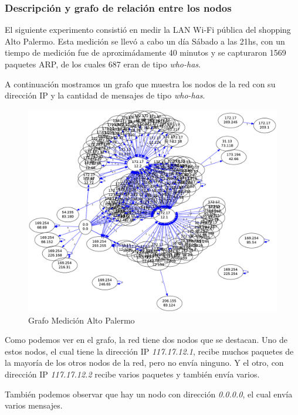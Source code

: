 \subsubsection{Descripción y grafo de relación entre los nodos}

El siguiente experimento consistió en medir la LAN Wi-Fi pública del shopping Alto Palermo. Esta medición se llevó a cabo un día Sábado a las 21hs, con un tiempo de medición fue de aproximádamente 40 minutos y se capturaron 1569 paquetes ARP, de los cuales 687 eran de tipo \emph{who-has}.

A continuación mostramos un grafo que muestra los nodos de la red con su dirección IP y la cantidad de mensajes de tipo \emph{who-has}.

\begin{figure}[H]
 \begin{center}
  \includegraphics[width=0.9\linewidth]{../imgs/red-alto-palermo_red.png}
  \caption{Grafo Medición Alto Palermo}
 \end{center}
\end{figure}

Como podemos ver en el grafo, la red tiene dos nodos que se destacan. Uno de estos nodos, el cual tiene la dirección IP \emph{117.17.12.1}, recibe muchos paquetes de la mayoría de los otros nodos de la red, pero no envía ninguno. Y el otro, con dirección IP \emph{117.17.12.2} recibe varios paquetes y también envía varios.

También podemos observar que hay un nodo con dirección \emph{0.0.0.0}, el cual envía varios mensajes. %

